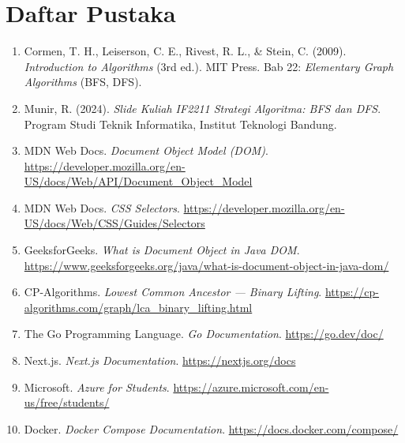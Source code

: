 \chapter*{Daftar Pustaka}

\begin{enumerate}
    \item Cormen, T. H., Leiserson, C. E., Rivest, R. L., \& Stein, C. (2009). \textit{Introduction to Algorithms} (3rd ed.). MIT Press. Bab 22: \textit{Elementary Graph Algorithms} (BFS, DFS).

    \item Munir, R. (2024). \textit{Slide Kuliah IF2211 Strategi Algoritma: BFS dan DFS}. Program Studi Teknik Informatika, Institut Teknologi Bandung.

    \item MDN Web Docs. \textit{Document Object Model (DOM)}. \url{https://developer.mozilla.org/en-US/docs/Web/API/Document_Object_Model}

    \item MDN Web Docs. \textit{CSS Selectors}. \url{https://developer.mozilla.org/en-US/docs/Web/CSS/Guides/Selectors}

    \item GeeksforGeeks. \textit{What is Document Object in Java DOM}. \url{https://www.geeksforgeeks.org/java/what-is-document-object-in-java-dom/}

    \item CP-Algorithms. \textit{Lowest Common Ancestor --- Binary Lifting}. \url{https://cp-algorithms.com/graph/lca_binary_lifting.html}

    \item The Go Programming Language. \textit{Go Documentation}. \url{https://go.dev/doc/}

    \item Next.js. \textit{Next.js Documentation}. \url{https://nextjs.org/docs}

    \item Microsoft. \textit{Azure for Students}. \url{https://azure.microsoft.com/en-us/free/students/}

    \item Docker. \textit{Docker Compose Documentation}. \url{https://docs.docker.com/compose/}
\end{enumerate}
